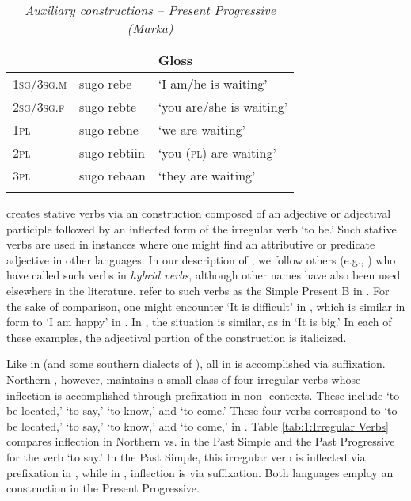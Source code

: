 \documentclass[output=paper]{../langsci/langscibook}
\begin{document}
 \begin{table}
 	\caption{\textit{Auxiliary constructions -- Present Progressive (Marka)}}
 	\label{tab:1:Auxiliary}
 	\begin{tabularx}{\textwidth}{Xll} 
 		\lsptoprule
 		& \ili{Marka}   & Gloss    \\
 		\midrule
 		1\textsc{sg}/3\textsc{sg.m} & sugo rebe & `I am/he is waiting' \\
 		2\textsc{sg}/3\textsc{sg.f} & sugo rebte  & `you are/she is waiting'  \\
 		1\textsc{pl} & sugo rebne & `we are waiting'  \\
 		2\textsc{pl} & sugo rebtiin & `you (\textsc{pl}) are waiting'  \\
 		3\textsc{pl} & sugo rebaan & `they are waiting'  \\
 		\lspbottomrule
 	\end{tabularx}
 \end{table}
 
  creates stative verbs via an  construction composed of an adjective or adjectival participle followed by an inflected form of the irregular verb  `to be.' Such stative verbs are used in instances where one might find an attributive or predicate adjective in other languages. In our description of , we follow others (e.g., \citealt{Andrzejewski1969,AjelloPuglielli1988}) who have called such verbs in  \textit{hybrid verbs}, although other names have also been used elsewhere in the literature. \citet{PasterRanero2015} refer to such verbs as the Simple Present B in . For the sake of comparison, one might encounter  `It is difficult' in , which is similar in form to  `I am happy' in . In , the situation is similar, as in  `It is big.' In each of these examples, the adjectival portion of the  construction is italicized.
 
 Like in  (and some southern dialects of ), all  in  is accomplished via suffixation. Northern , however, maintains a small class of four irregular verbs whose inflection is accomplished through prefixation in non- contexts. These include  `to be located,'  `to say,'  `to know,' and  `to come.' These four verbs correspond to  `to be located,'  `to say,'  `to know,' and  `to come,' in . Table \ref{tab:1:Irregular Verbs} compares inflection in Northern  vs.  in the Past Simple and the Past Progressive for the verb `to say.' In the Past Simple, this irregular verb is inflected via prefixation in , while in , inflection is via suffixation. Both languages employ an  construction in the Present Progressive.
 
\end{document}

